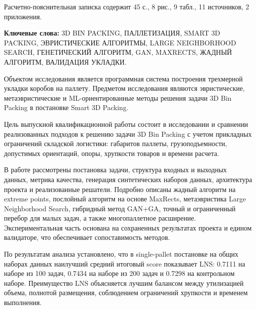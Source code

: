 
Расчетно-пояснительная записка содержит 45 с., 8 рис., 9 табл., 11 источников, 2 приложения.

\textbf{Ключевые слова:} 3D BIN PACKING, ПАЛЛЕТИЗАЦИЯ, SMART 3D PACKING, ЭВРИСТИЧЕСКИЕ АЛГОРИТМЫ, LARGE NEIGHBORHOOD SEARCH, ГЕНЕТИЧЕСКИЙ АЛГОРИТМ, GAN, MAXRECTS, ЖАДНЫЙ АЛГОРИТМ, ВАЛИДАЦИЯ УКЛАДКИ.

Объектом исследования является программная система построения трехмерной укладки коробов на паллету. Предметом исследования являются эвристические, метаэвристические и ML-ориентированные методы решения задачи 3D Bin Packing в постановке Smart 3D Packing.

Цель выпускной квалификационной работы состоит в исследовании и сравнении реализованных подходов к решению задачи 3D Bin Packing с учетом прикладных ограничений складской логистики: габаритов паллеты, грузоподъемности, допустимых ориентаций, опоры, хрупкости товаров и времени расчета.

В работе рассмотрены постановка задачи, структура входных и выходных данных, метрика качества, генерация синтетических наборов данных, архитектура проекта и реализованные решатели. Подробно описаны жадный алгоритм на extreme points, послойный алгоритм на основе MaxRects, метаэвристика Large Neighborhood Search, гибридный метод GAN+GA, точный и ограниченный перебор для малых задач, а также многопаллетное расширение. Экспериментальная часть основана на сохраненных результатах проекта и едином валидаторе, что обеспечивает сопоставимость методов.

По результатам анализа установлено, что в single-pallet постановке на общих наборах данных наилучший средний итоговый score показывает LNS: 0.7111 на наборе из 100 задач, 0.7434 на наборе из 200 задач и 0.7298 на контрольном наборе. Преимущество LNS объясняется лучшим балансом между утилизацией объема, полнотой размещения, соблюдением ограничений хрупкости и временем выполнения.
